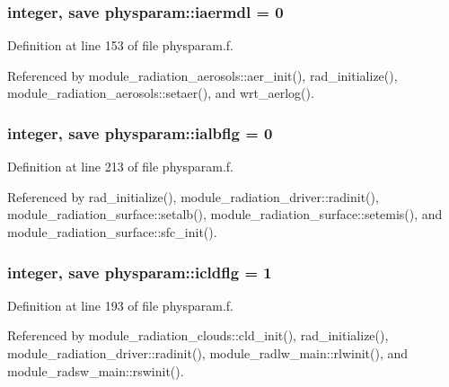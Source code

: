 \subsubsection[{\texorpdfstring{iaermdl}{iaermdl}}]{\setlength{\rightskip}{0pt plus 5cm}integer, save physparam\+::iaermdl = 0}\hypertarget{namespacephysparam_a6fe54722a9d657514d7e4df8f49395fc}{}\label{namespacephysparam_a6fe54722a9d657514d7e4df8f49395fc}


Definition at line 153 of file physparam.\+f.



Referenced by module\+\_\+radiation\+\_\+aerosols\+::aer\+\_\+init(), rad\+\_\+initialize(), module\+\_\+radiation\+\_\+aerosols\+::setaer(), and wrt\+\_\+aerlog().

\subsubsection[{\texorpdfstring{ialbflg}{ialbflg}}]{\setlength{\rightskip}{0pt plus 5cm}integer, save physparam\+::ialbflg = 0}\hypertarget{namespacephysparam_aeaf899d0cbd4248ad4b7f855cb4626e1}{}\label{namespacephysparam_aeaf899d0cbd4248ad4b7f855cb4626e1}


Definition at line 213 of file physparam.\+f.



Referenced by rad\+\_\+initialize(), module\+\_\+radiation\+\_\+driver\+::radinit(), module\+\_\+radiation\+\_\+surface\+::setalb(), module\+\_\+radiation\+\_\+surface\+::setemis(), and module\+\_\+radiation\+\_\+surface\+::sfc\+\_\+init().

\subsubsection[{\texorpdfstring{icldflg}{icldflg}}]{\setlength{\rightskip}{0pt plus 5cm}integer, save physparam\+::icldflg = 1}\hypertarget{namespacephysparam_aaba5cffa32ce34374f15cb09e21ab973}{}\label{namespacephysparam_aaba5cffa32ce34374f15cb09e21ab973}


Definition at line 193 of file physparam.\+f.



Referenced by module\+\_\+radiation\+\_\+clouds\+::cld\+\_\+init(), rad\+\_\+initialize(), module\+\_\+radiation\+\_\+driver\+::radinit(), module\+\_\+radlw\+\_\+main\+::rlwinit(), and module\+\_\+radsw\+\_\+main\+::rswinit().

